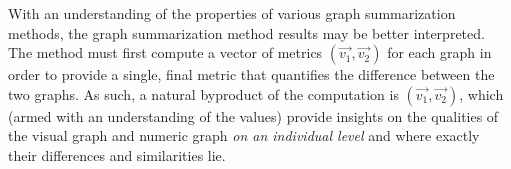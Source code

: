 With an understanding of the properties of various graph summarization methods, 
the graph summarization method results may be better interpreted. The method 
must first compute a vector of metrics 
$(\overrightarrow{v_1},\overrightarrow{v_2})$ for each graph in order to 
provide a single, final metric that quantifies the difference between the two 
graphs. As such, a natural byproduct of the computation is 
$(\overrightarrow{v_1},\overrightarrow{v_2})$, which (armed with an 
understanding of the values) provide insights on the qualities of the visual 
graph and numeric graph \textit{on an individual level} and where exactly their 
differences and similarities lie.